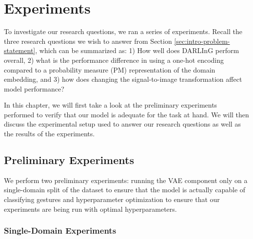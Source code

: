 \chapter{Experiments}

To investigate our research questions, we ran a series of experiments.
Recall the three research questions we wish to answer from Section \ref{sec:intro-problem-statement}, which can be summarized as: 1) How well does DARLInG perform overall, 2) what is the performance difference in using a one-hot encoding compared to a probability measure (PM) representation of the domain embedding, and 3) how does changing the signal-to-image transformation affect model performance?

In this chapter, we will first take a look at the preliminary experiments performed to verify that our model is adequate for the task at hand.
We will then discuss the experimental setup used to answer our research questions as well as the results of the experiments.

\section{Preliminary Experiments}\label{sec:experiments-preliminary}

We perform two preliminary experiments: running the VAE component only on a single-domain split of the dataset to ensure that the model is actually capable of classifying gestures and hyperparameter optimization to ensure that our experiments are being run with optimal hyperparameters.

\subsection{Single-Domain Experiments}

